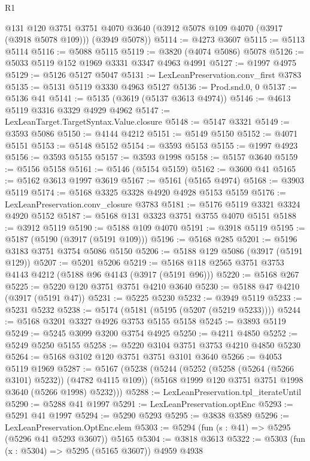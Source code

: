 \begin{lexlean}{R1}
\begin{coremodule}
      @131
      @120
      @3751
      @3751
      @4070
      @3640
      (@3912 @5078 @109 @4070 (@3917 (@3918 @5078 @109)))
      (@3949 @5078))
@5114 := @4273 @3607
@5115 := @5113 @5114
@5116 := @5088 @5115
@5119 := @3820 (@4074 @5086) @5078
@5126 := @5033 @5119 @152 @1969 @3331 @3347 @4963 @4991
@5127 := @1997 @4975
@5129 := @5126 @5127 @5047
@5131 := LexLeanPreservation.conv_first @3783
@5135 := @5131 @5119 @3330 @4963 @5127
@5136 := Prod.snd.{0, 0}
@5137 := @5136 @41
@5141 := @5135 (@3619 (@5137 @3613 @4974))
@5146 := @4613 @5119 @3316 @3329 @4929 @4962
@5147 := LexLeanTarget.TargetSyntax.Value.closure
@5148 := @5147 @3321
@5149 := @3593 @5086
@5150 := @4144 @4212
@5151 := @5149 @5150
@5152 := @4071 @5151
@5153 := @5148 @5152
@5154 := @3593 @5153
@5155 := @1997 @4923
@5156 := @3593 @5155
@5157 := @3593 @1998
@5158 := @5157 @3640
@5159 := @5156 @5158
@5161 := @5146 (@5154 @5159)
@5162 := @3600 @41
@5165 := @5162 @3613 @1997 @3619
@5167 := @5161 (@5165 @4974)
@5168 := @3903 @5119
@5174 := @5168 @3325 @3328 @4920 @4928 @5153 @5159
@5176 := LexLeanPreservation.conv_closure @3783
@5181 := @5176 @5119 @3321 @3324 @4920 @5152
@5187 := @5168 @131 @3323 @3751 @3755 @4070 @5151
@5188 := @3912 @5119
@5190 := @5188 @109 @4070
@5191 := @3918 @5119
@5195 := @5187 (@5190 (@3917 (@5191 @109)))
@5196 := @5168 @285
@5201 := @5196 @3183 @3751 @3754 @5086 @5150
@5206 := @5188 @129 @5086 (@3917 (@5191 @129))
@5207 := @5201 @5206
@5219 := @5168 @118 @2565 @3751 @3753 @4143 @4212 (@5188 @96 @4143 (@3917 (@5191 @96)))
@5220 := @5168 @267
@5225 := @5220 @120 @3751 @3751 @4210 @3640
@5230 := @5188 @47 @4210 (@3917 (@5191 @47))
@5231 := @5225 @5230
@5232 := @3949 @5119
@5233 := @5231 @5232
@5238 := @5174 (@5181 (@5195 (@5207 (@5219 @5233))))
@5244 := @5168 @3201 @3327 @4926 @3753 @5155 @5158
@5245 := @3893 @5119
@5249 := @5245 @3099 @3200 @3754 @4925
@5250 := @4211 @4850
@5252 := @5249 @5250 @5155
@5258 := @5220 @3104 @3751 @3753 @4210 @4850 @5230
@5264 := @5168 @3102 @120 @3751 @3751 @3101 @3640
@5266 := @4053 @5119 @1969
@5287 := @5167
    (@5238
      (@5244
        (@5252 (@5258 (@5264 (@5266 @3101) @5232)) (@4782 @4115 @109))
        (@5168 @1999 @120 @3751 @3751 @1998 @3640 (@5266 @1998) @5232)))
@5288 := LexLeanPreservation.tpl_iterateUntil
@5290 := @5288 @41 @1997
@5291 := LexLeanPreservation.optEnc
@5293 := @5291 @41 @1997
@5294 := @5290 @5293
@5295 := @3838 @3589
@5296 := LexLeanPreservation.OptEnc.elem
@5303 := @5294 (fun (s : @41) => @5295 (@5296 @41 @5293 @3607)) @5165
@5304 := @3818 @3613
@5322 := @5303
    (fun (x : @5304) => @5295 (@5165 @3607))
    @4959
    @4938

\end{coremodule}
\end{lexlean}

